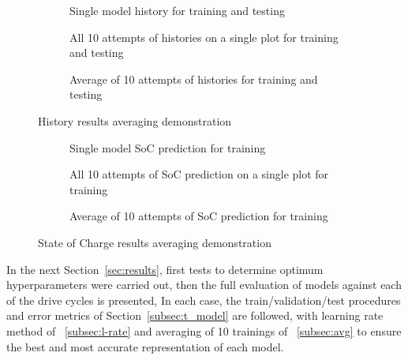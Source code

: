 \begin{figure*}[htbp]
  \centering
  \begin{subfigure}[b]{0.325\textwidth}
      \centering
      
      \caption{Single model history for training and testing}
      \label{subfig:Model-DEMO-1}
  \end{subfigure}
  \hfill
  \begin{subfigure}[b]{0.325\textwidth}
      \centering
      
      \caption{All 10 attempts of histories on a single plot for training and testing}
      \label{subfig:Model-DEMO-10}
  \end{subfigure}
  \hfill
  \begin{subfigure}[b]{0.325\textwidth}
      \centering
      
      \caption{Average of 10 attempts of histories for training and testing}
      \label{subfig:Model-DEMO-avr}
  \end{subfigure}
  \caption{History results averaging demonstration}
  \label{fig:Model-DEMO}
\end{figure*}
\begin{figure*}[htbp]
  \centering
  \begin{subfigure}[b]{0.325\textwidth}
      \centering
      
      \caption{Single model SoC prediction for training \ \ \ \ \ }
      \label{subfig:Model-DEMO2-1}
  \end{subfigure}
  \hfill
  \begin{subfigure}[b]{0.325\textwidth}
      \centering
      
      \caption{All 10 attempts of SoC prediction on a single plot for training}
      \label{subfig:Model-DEMO2-10}
  \end{subfigure}
  \hfill
  \begin{subfigure}[b]{0.325\textwidth}
      \centering
      
      \caption{Average of 10 attempts of SoC prediction for training}
      \label{subfig:Model-DEMO2-avr}
  \end{subfigure}
  \caption{State of Charge results averaging demonstration}
  \label{fig:Model-DEMO2}
\end{figure*}

%
%
In the next Section~\ref{sec:results}, first tests to determine optimum hyperparameters were carried out, then the full evaluation of models against each of the drive cycles is presented,
In each case, the train/validation/test procedures and error metrics of Section~\ref{subsec:t_model} are followed, with learning rate method of ~\ref{subsec:l-rate} and averaging of 10 trainings of ~\ref{subsec:avg} to ensure the best and most accurate representation of each model.